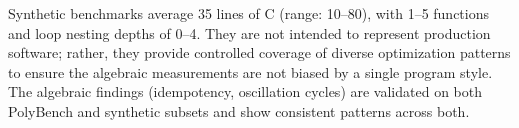\documentclass[11pt]{article}
\begin{document}
Synthetic benchmarks average 35 lines of C (range: 10--80), with 1--5 functions and loop nesting depths of 0--4. They are not intended to represent production software; rather, they provide controlled coverage of diverse optimization patterns to ensure the algebraic measurements are not biased by a single program style. The algebraic findings (idempotency, oscillation cycles) are validated on both PolyBench and synthetic subsets and show consistent patterns across both.
\end{document}
